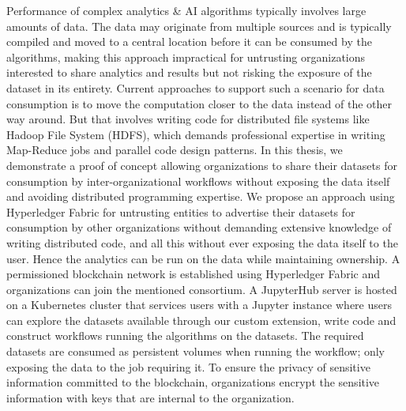 
\abstract

Performance of complex analytics \& AI algorithms typically involves large amounts of data. The data may originate from multiple sources and is typically compiled and moved to a central location before it can be consumed by the algorithms, making this approach impractical for untrusting organizations interested to share analytics and results but not risking the exposure of the dataset in its entirety. Current approaches to support such a scenario for data consumption is to move the computation closer to the data instead of the other way around. But that involves writing code for distributed file systems like Hadoop File System (HDFS), which demands professional expertise in writing Map-Reduce jobs and parallel code design patterns. In this thesis, we demonstrate a proof of concept allowing organizations to share their datasets for consumption by inter-organizational workflows without exposing the data itself and avoiding distributed programming expertise. We propose an approach using Hyperledger Fabric for untrusting entities to advertise their datasets for consumption by other organizations without demanding extensive knowledge of writing distributed code, and all this without ever exposing the data itself to the user. Hence the analytics can be run on the data while maintaining ownership. A permissioned blockchain network is established using Hyperledger Fabric and organizations can join the mentioned consortium. A JupyterHub server is hosted on a Kubernetes cluster that services users with a Jupyter instance where users can explore the datasets available through our custom extension, write code and construct workflows running the algorithms on the datasets. The required datasets are consumed as persistent volumes when running the workflow; only exposing the data to the job requiring it. To ensure the privacy of sensitive information committed to the blockchain, organizations encrypt the sensitive information with keys that are internal to the organization.